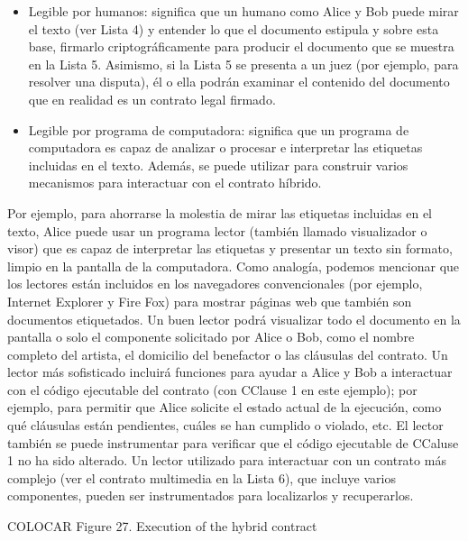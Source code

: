 \documentclass[12pt]{report} %
\begin{document}
\begin{itemize}
\begin{itemize}
    \item Legible por humanos: significa que un humano como Alice y Bob puede mirar el texto (ver Lista 4) y entender lo que el documento estipula y sobre esta base, firmarlo criptográficamente para producir el documento que se muestra en la Lista 5. Asimismo, si la Lista 5 se presenta a un juez (por ejemplo, para resolver una disputa), él o ella podrán examinar el contenido del documento que en realidad es un contrato legal firmado.
    \item Legible por programa de computadora: significa que un programa de computadora es capaz de analizar o procesar e interpretar las etiquetas incluidas en el texto. Además, se puede utilizar para construir varios mecanismos para interactuar con el contrato híbrido. 

    
\end{itemize}

Por ejemplo, para ahorrarse la molestia de mirar las etiquetas incluidas en el texto, Alice puede usar un programa lector (también llamado visualizador o visor) que es capaz de interpretar las etiquetas y presentar un texto sin formato, limpio en la pantalla de la computadora. Como analogía, podemos mencionar que los lectores están incluidos en los navegadores convencionales (por ejemplo, Internet Explorer y Fire Fox) para mostrar páginas web que también son documentos etiquetados. Un buen lector podrá visualizar todo el documento en la pantalla o solo el componente solicitado por Alice o Bob, como el nombre completo del artista, el domicilio del benefactor o las cláusulas del contrato. Un lector más sofisticado incluirá funciones para ayudar a Alice y Bob a interactuar con el código ejecutable del contrato (con CClause 1 en este ejemplo); por ejemplo, para permitir que Alice solicite el estado actual de la ejecución, como qué cláusulas están pendientes, cuáles se han cumplido o violado, etc.  El lector también se puede instrumentar para verificar que el código ejecutable de CCaluse 1 no ha sido alterado. Un lector utilizado para interactuar con un contrato más complejo (ver el contrato multimedia en la Lista 6), que incluye varios componentes, pueden ser instrumentados para localizarlos y recuperarlos.

COLOCAR Figure 27. Execution of the hybrid contract


\end{itemize}
\end{document}
